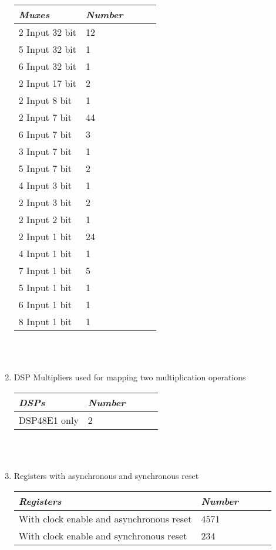 \documentclass[12pt]{article}
\begin{document}
\begin{enumerate}
\begin{tabular}{ *5l }    \toprule
\emph{Muxes} & \emph{Number}  \\\midrule
2 Input 32 bit   & 12  \\ 
5 Input 32 bit   & 1 \\
6 Input 32 bit   & 1  \\
2 Input 17 bit   & 2 \\
2 Input 8 bit    & 1\\
2 Input 7 bit    & 44\\
6 Input 7 bit    & 3\\
3 Input 7 bit    & 1\\
5 Input 7 bit    & 2\\
4 Input 3 bit    & 1\\
2 Input 3 bit    & 2\\
2 Input 2 bit    & 1\\
2 Input 1 bit    & 24\\
4 Input 1 bit    & 1\\
7 Input 1 bit    & 5\\
5 Input 1 bit    & 1\\
6 Input 1 bit    & 1\\
8 Input 1 bit    & 1\\

\end{tabular}\\\\


\item DSP Multipliers used for mapping two multiplication operations\\

\begin{tabular}{ *5l }    \toprule
\emph{ DSPs} & \emph{Number}  \\\midrule
DSP48E1 only     & 2  \\ 

\end{tabular}\\\\


\item Registers with asynchronous and synchronous reset\\

\begin{tabular}{ *5l }    \toprule
\emph{ Registers} & \emph{Number}  \\\midrule
With clock enable and asynchronous reset     & 4571  \\ 
With clock enable and synchronous reset      &234


\end{tabular}
\end{enumerate}
\end{document}
